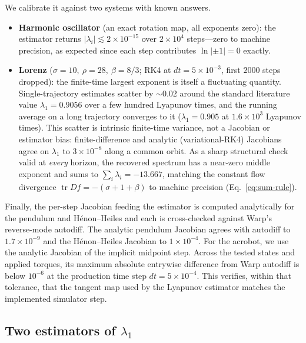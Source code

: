 \documentclass[11pt]{article}
\begin{document}
We calibrate it against two systems with known answers.
\begin{itemize}
\item \textbf{Harmonic oscillator} (an exact rotation map, all exponents zero): the estimator
returns $\lvert\lambda_i\rvert \lesssim 2\times10^{-15}$ over $2\times10^4$ steps---zero to machine
precision, as expected since each step contributes $\ln\lvert{\pm}1\rvert = 0$ exactly.
\item \textbf{Lorenz} ($\sigma=10,\ \rho=28,\ \beta=8/3$; RK4 at $dt=5\times10^{-3}$, first $2000$
steps dropped): the finite-time largest exponent is itself a fluctuating quantity. Single-trajectory
estimates scatter by $\sim\!0.02$ around the standard literature value $\lambda_1 = 0.9056$ over a
few hundred Lyapunov times, and the running average on a long trajectory converges to it
($\lambda_1 = 0.905$ at $1.6\times10^3$ Lyapunov times). This scatter is intrinsic finite-time
variance, not a Jacobian or estimator bias: finite-difference and analytic (variational-RK4)
Jacobians agree on $\lambda_1$ to $3\times10^{-8}$ along a common orbit. As a sharp structural check
valid at \emph{every} horizon, the recovered spectrum has a near-zero middle exponent and sums to
$\sum_i\lambda_i = -13.667$, matching the constant flow divergence
$\operatorname{tr} Df = -(\sigma+1+\beta)$ to machine precision (Eq.~\eqref{eq:sum-rule}).
\end{itemize}

Finally, the per-step Jacobian feeding the estimator is computed analytically for the pendulum and
Hénon--Heiles and each is cross-checked against Warp's reverse-mode autodiff. The analytic pendulum
Jacobian agrees with autodiff to $1.7\times10^{-9}$ and the Hénon--Heiles Jacobian to $1\times10^{-4}$.
For the acrobot, we use the analytic Jacobian of the implicit midpoint step.
Across the tested states and applied torques, its maximum absolute entrywise difference
from Warp autodiff is below $10^{-6}$ at the production time step $dt=5\times10^{-4}$.
This verifies, within that tolerance, that the tangent map used by the Lyapunov
estimator matches the implemented simulator step.

\subsection{Two estimators of \texorpdfstring{$\lambda_1$}{lambda1}}\label{sec:m-consistency}
\end{document}
